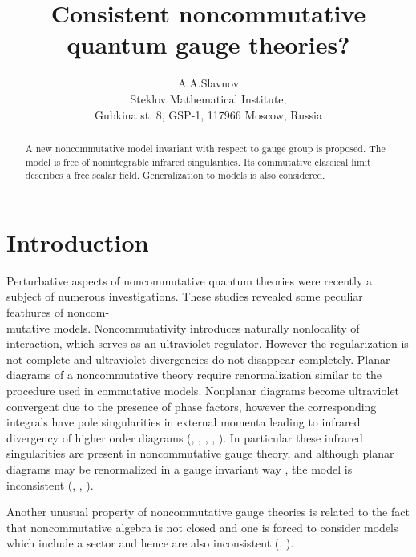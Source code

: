 \documentclass[a4paper,12pt]{article}
\begin{document}
\title{ Consistent noncommutative quantum gauge theories?}
\author{A.A.Slavnov \\ Steklov Mathematical
Institute, \\Gubkina st. 8, GSP-1, 117966 Moscow, Russia}  \maketitle

\begin{abstract}

A new noncommutative model invariant with respect to \coordHE{} gauge group
 is proposed. The model is free of nonintegrable infrared
 singularities. Its commutative classical limit describes a free
 scalar field. Generalization to \coordHE{} models is also
 considered.

\end{abstract}

\section{Introduction}

Perturbative aspects of noncommutative quantum theories were recently
 a subject of numerous investigations.
These studies revealed some peculiar feathures of noncom-\\mutative
models.  Noncommutativity introduces naturally nonlocality of interaction,
which serves as an ultraviolet regulator. However the regularization is
not complete and ultraviolet divergencies do not disappear completely.
Planar diagrams of a noncommutative theory require renormalization similar
to the procedure used in commutative models. Nonplanar diagrams become
ultraviolet convergent due to the presence of phase factors, however
the corresponding integrals have pole singularities in external
momenta leading to infrared divergency of higher order diagrams
(\cite{Fi}, \cite{KW}, \cite{MRS}, \cite{ABK}, \cite{GKW}).  In
particular these infrared singularities are present in noncommutative
\coordHE{} gauge theory, and although planar diagrams may be renormalized in a
gauge invariant way \cite{MS}, the model is inconsistent
(\cite{Ha}, \cite{MST}, \cite{ABKR}).

Another unusual property of noncommutative gauge theories is related to
the fact that noncommutative \coordHE{} algebra is not closed and one is
forced to consider \coordHE{} models which include a \coordHE{} sector and
hence are also inconsistent (\cite{AA}, \cite{BS}).
\end{document}
